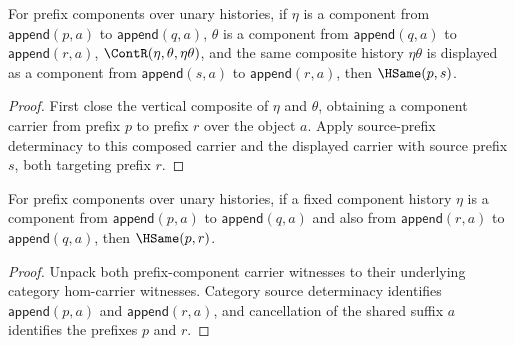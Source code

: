 \begin{theorem}
\label{thm:nattrans-prefix-component-vertical-composite-source-prefix-determinacy}
For prefix components over unary histories, if \(\eta\) is a component from
\(\mathsf{append}(p,a)\) to \(\mathsf{append}(q,a)\), \(\theta\) is a component
from \(\mathsf{append}(q,a)\) to \(\mathsf{append}(r,a)\),
\(\ContR(\eta,\theta,\eta\theta)\), and the same composite history
\(\eta\theta\) is displayed as a component from \(\mathsf{append}(s,a)\) to
\(\mathsf{append}(r,a)\), then \(\HSame(p,s)\).
\end{theorem}
\begin{proof}
First close the vertical composite of \(\eta\) and \(\theta\), obtaining a
component carrier from prefix \(p\) to prefix \(r\) over the object \(a\). Apply
source-prefix determinacy to this composed carrier and the displayed carrier
with source prefix \(s\), both targeting prefix \(r\).
\end{proof}

\begin{theorem}
\label{thm:nattrans-prefix-component-carrier-source-prefix-deterministic}
For prefix components over unary histories, if a fixed component history
$\eta$ is a component from $\mathsf{append}(p,a)$ to
$\mathsf{append}(q,a)$ and also from $\mathsf{append}(r,a)$ to
$\mathsf{append}(q,a)$, then $\HSame(p,r)$.
\end{theorem}
\begin{proof}
Unpack both prefix-component carrier witnesses to their underlying category
hom-carrier witnesses. Category source determinacy identifies
$\mathsf{append}(p,a)$ and $\mathsf{append}(r,a)$, and cancellation of the
shared suffix $a$ identifies the prefixes $p$ and $r$.
\end{proof}

